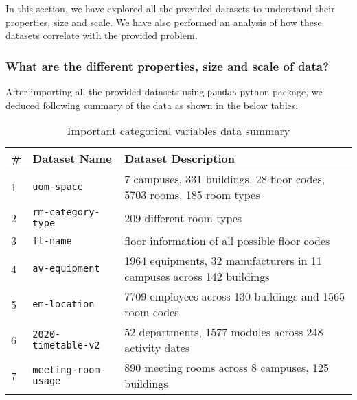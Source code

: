 In this section, we have explored all the provided datasets to understand their properties, size and scale. We have also performed an analysis of how these datasets correlate with the provided problem.

\subsubsection{What are the different properties, size and scale of data?}

After importing all the provided datasets using \texttt{pandas} python package, we deduced following summary of the data as shown in the below tables.

\begin{table}[H]
\centering
\begin{tabular}{|l|l|l|}
\hline
\# & \textbf{Dataset Name} & \textbf{Dataset Description}                                           \\ \hline
1  & \texttt{uom-space}             &  7 campuses, 331 buildings, 28 floor codes, 5703 rooms, 185 room types             \\ \hline
2  & \texttt{rm-category-type}      & 209 different room types               \\ \hline
3  & \texttt{fl-name}               & floor information of all possible floor codes              \\ \hline
4  & \texttt{av-equipment}         & 1964 equipments, 32 manufacturers in 11 campuses across 142 buildings        \\ \hline
5  & \texttt{em-location}           & 7709 employees across 130 buildings and 1565 room codes                       \\ \hline
6  & \texttt{2020-timetable-v2}     & 52 departments, 1577 modules across 248 activity dates \\ \hline
7  & \texttt{meeting-room-usage}    & 890 meeting rooms across 8 campuses, 125 buildings                                   \\ \hline
\end{tabular}
\caption{Important categorical variables data summary}
\end{table}

